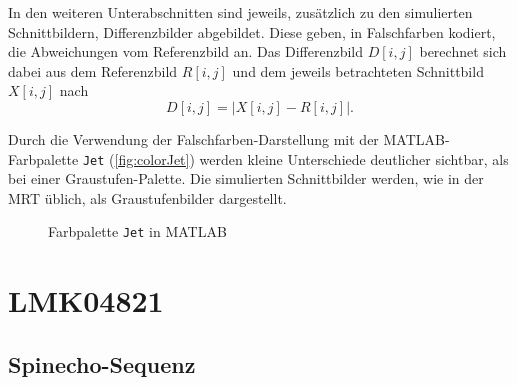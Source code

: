 In den weiteren Unterabschnitten sind jeweils, zusätzlich zu den simulierten Schnittbildern, Differenzbilder abgebildet. Diese geben, in Falschfarben kodiert, die Abweichungen vom Referenzbild an. Das Differenzbild $D[i,j]$ berechnet sich dabei aus dem Referenzbild $R[i,j]$ und dem jeweils betrachteten Schnittbild $X[i,j]$ nach
\begin{equation}
	D[i,j]=\left| X[i,j]-R[i,j]\right|.
\end{equation}

Durch die Verwendung der Falschfarben-Darstellung mit der MATLAB-Farbpalette \texttt{Jet} (\autoref{fig:colorJet}) werden kleine Unterschiede deutlicher sichtbar, als bei einer Graustufen-Palette. Die simulierten Schnittbilder werden, wie in der MRT üblich, als Graustufenbilder dargestellt.
\begin{figure}[H]
	\centering
	\caption[]{Farbpalette \texttt{Jet} in MATLAB}
	\label{fig:colorJet}
\end{figure}


\section{LMK04821}

\subsection{Spinecho-Sequenz}

